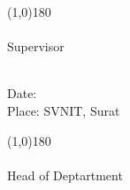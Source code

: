 \begin{multicols}{2}
    \begin{center}
        \line(1,0){180}\\
        {\SupervisorName} \\ 
        {Supervisor} \\ 
        {\SupervisorDept} \\ 
        {\SupervisorUni}
    \end{center}
    
    \columnbreak

    \begin{center}
    \end{center}

\end{multicols}

\vspace{75pt}

\begin{multicols}{2}

        {Date:} \\ 
        {Place: SVNIT, Surat}    
    \columnbreak
    
    \begin{center}
        \line(1,0){180}\\
        {\HODName} \\ 
        {Head of Deptartment} \\ 
        {\StudentDept} \\ 
        {\StudentUni}
    \end{center}

\end{multicols}

\vspace{15pt}


